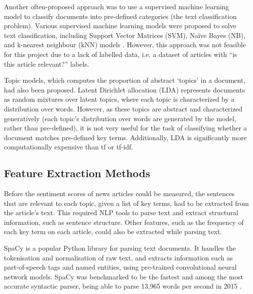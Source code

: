 \documentclass{report}
\begin{document}
Another often-proposed approach was to use a supervised machine learning model to classify documents into pre-defined categories (the text classification problem).
Various supervised machine learning models were proposed to solve text classification, including Support Vector Matrices (SVM), Na\"{i}ve Bayes (NB), and k-nearest neighbour (kNN) models \cite{khan2010review}.
However, this approach was not feasible for this project due to a lack of labelled data, i.e. a dataset of articles with ``is this article relevant?'' labels.

Topic models, which computes the proportion of abstract `topics' in a document, had also been proposed.
Latent Dirichlet allocation (LDA) \cite{blei2003latent} represents documents as random mixtures over latent topics, where each topic is characterized by a distribution over words.
However, as these topics are abstract and characterized generatively (each topic's distribution over words are generated by the model, rather than pre-defined), it is not very useful for the task of classifying whether a document matches pre-defined key terms.
Additionally, LDA is significantly more computationally expensive than tf or tf-idf.

\subsection{Feature Extraction Methods} \label{tc-matching}
Before the sentiment scores of news articles could be measured, the sentences that are relevant to each topic, given a list of key terms, had to be extracted from the article's text.
This required NLP tools to parse text and extract structural information, such as sentence structure.
Other features, such as the frequency of each key term on each article, could also be extracted while parsing text.

SpaCy \cite{SpaCy} is a popular Python library for parsing text documents.
It handles the tokenisation and normalisation of raw text, and extracts information such as part-of-speech tags and named entities, using pre-trained convolutional neural network models.
SpaCy was benchmarked to be the fastest and among the most accurate syntactic parser, being able to parse 13,965 words per second in 2015 \cite{choi2015depends}.
\end{document}
